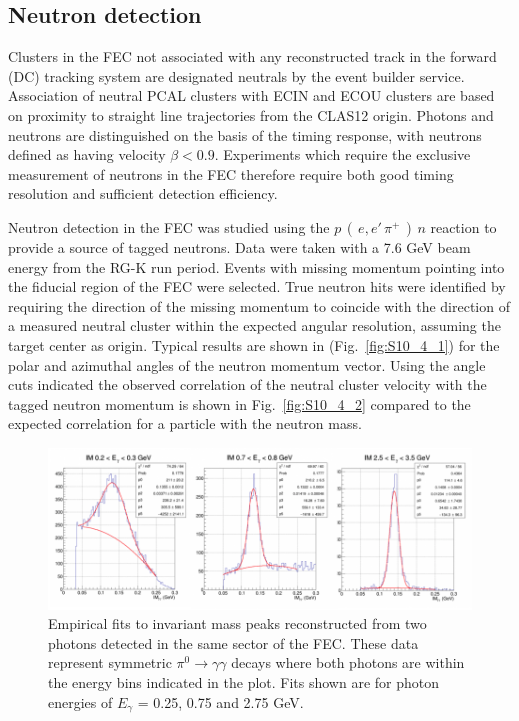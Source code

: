 \subsection{Neutron detection}
Clusters in the FEC not associated with any reconstructed track in the forward (DC) tracking system are designated neutrals by the event builder service.  Association of neutral PCAL clusters with ECIN and ECOU clusters are based on proximity to straight line trajectories from the CLAS12 origin.  Photons and neutrons are distinguished on the basis of the timing response, with neutrons defined as having velocity $\beta < 0.9$.  Experiments which require the exclusive measurement of neutrons in the FEC therefore require both good timing resolution and sufficient detection efficiency. 

Neutron detection in the FEC was studied using the $p\,(\,e,e'\,\pi^+\,)\,n$ reaction to provide a source of tagged neutrons. Data were taken with a 7.6 GeV beam energy from the RG-K run period.  Events with missing momentum pointing into the fiducial region of the FEC were selected.  True neutron hits were identified by requiring the direction of the missing momentum to coincide with the direction of a measured neutral cluster within the expected angular resolution, assuming the target center as origin.  Typical results are shown in (Fig.~\ref{fig:S10_4_1}) for the polar and azimuthal angles of the neutron momentum vector.  Using the angle cuts indicated the observed correlation of the neutral cluster velocity with the tagged neutron momentum is shown in Fig.~\ref{fig:S10_4_2} compared to the expected correlation for a particle with the neutron mass.   

\begin{figure}[hbt]
\centering
\includegraphics[width=1.0\columnwidth,keepaspectratio]{img/fx-pi0-fits.png}
\caption[]{Empirical fits to invariant mass peaks reconstructed from two photons detected in the same sector of the FEC.  These data represent symmetric $\pi^0 \rightarrow \gamma \gamma$ decays where both photons are within the energy bins indicated in the plot. Fits shown are for photon energies of $E_{\gamma}$ = 0.25, 0.75 and 2.75 GeV.}
\label{fig:fx-pi0-fits}
\end{figure}

